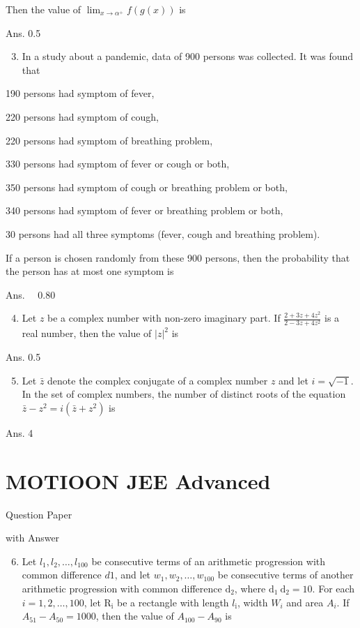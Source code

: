 \documentclass[10pt]{article}
\begin{document}
Then the value of $\lim _{x \rightarrow \alpha^{+}} f(g(x))$ is

Ans. 0.5

\begin{enumerate}
  \setcounter{enumi}{2}
  \item In a study about a pandemic, data of 900 persons was collected. It was found that
\end{enumerate}

190 persons had symptom of fever,

220 persons had symptom of cough,

220 persons had symptom of breathing problem,

330 persons had symptom of fever or cough or both,

350 persons had symptom of cough or breathing problem or both,

340 persons had symptom of fever or breathing problem or both,

30 persons had all three symptoms (fever, cough and breathing problem).

If a person is chosen randomly from these 900 persons, then the probability that the person has at most one symptom is

Ans. $\quad 0.80$

\begin{enumerate}
  \setcounter{enumi}{3}
  \item Let $z$ be a complex number with non-zero imaginary part. If $\frac{2+3 z+4 z^{2}}{2-3 z+4 z^{2}}$ is a real number, then the value of $|z|^{2}$ is
\end{enumerate}

Ans. 0.5

\begin{enumerate}
  \setcounter{enumi}{4}
  \item Let $\bar{z}$ denote the complex conjugate of a complex number $z$ and let $i=\sqrt{-1}$. In the set of complex numbers, the number of distinct roots of the equation $\bar{z}-z^{2}=i\left(\bar{z}+z^{2}\right)$ is
\end{enumerate}

Ans. 4

\section{MOTIOON JEE Advanced}
Question Paper

with Answer

\begin{enumerate}
  \setcounter{enumi}{5}
  \item Let $l_{1}, l_{2}, \ldots, l_{100}$ be consecutive terms of an arithmetic progression with common difference $d 1$, and let $w_{1}, w_{2}, \ldots, w_{100}$ be consecutive terms of another arithmetic progression with common difference $\mathrm{d}_{2}$, where $\mathrm{d}_{1} \mathrm{~d}_{2}=10$. For each $i=1,2, \ldots, 100$, let $\mathrm{R}_{\mathrm{i}}$ be a rectangle with length $l_{\mathrm{i}}$, width $W_{i}$ and area $A_{i}$. If $A_{51}-A_{50}=1000$, then the value of $A_{100}-A_{90}$ is
\end{enumerate}
\end{document}
